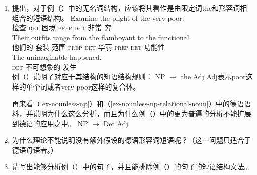{\begin{enumerate}
请在你的回答中考虑到并列的语料。请假设对称的并列结构要求其并列的短语或词具有相同的句法属性。

\item  \citet{FLGR2012a}提出，对于例（）中的无名词结构，应该将其看作是由限定词the和形容词相组合的短语结构。
\eal
\ex 
\gll Examine the plight of the very poor.\\
检查 \textsc{det} 困境 \textsc{prep} \textsc{det} 非常 穷\\
\ex 
\gll Their outfits range from the flamboyant to the functional.\\
他们的 套装 范围 \textsc{prep} \textsc{det} 华丽 \textsc{prep} \textsc{det} 功能性\\
\ex 
\gll The unimaginable happened.\\
\textsc{det} 不可想象的 发生\\
\zl
例（）说明了对应于其结构的短语结构规则：
\ea
NP $\to$ the Adj
\z
Adj表示poor这样的单个词或者very poor这样的复合体。

再来看（\ref{ex-nounless-np}）和（\ref{ex-nounless-np-relational-noun}）中的德语语料，并说明为什么这么分析，而且为什么例（）中的更为普遍的分析不能扩展到德语的应用之中。
\ea
NP $\to$ Det Adj
\z

\item 为什么\xbarc 理论不能说明没有额外假设的德语形容词短语呢？（这一问题只适合于德语母语者。）

\item 请写出能够分析例（）中的句子，并且能排除例（）的句子的短语结构文法。


\end{enumerate}}
